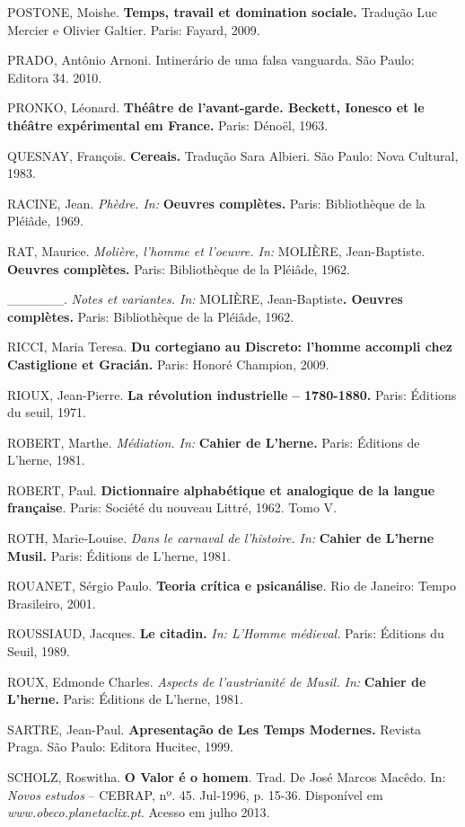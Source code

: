 POSTONE, Moishe. \textbf{Temps, travail et domination sociale.} Tradução
Luc Mercier e Olivier Galtier. Paris: Fayard, 2009.

PRADO, Antônio Arnoni. Intinerário de uma falsa vanguarda. São Paulo:
Editora 34. 2010.

PRONKO, Léonard. \textbf{Théâtre de l'avant-garde. Beckett, Ionesco et
le théâtre expérimental em France.} Paris: Dénoël, 1963.

QUESNAY, François. \textbf{Cereais.} Tradução Sara Albieri. São Paulo:
Nova Cultural, 1983.

RACINE, Jean. \emph{Phèdre. In:} \textbf{Oeuvres complètes.} Paris:
Bibliothèque de la Pléiâde, 1969.

RAT, Maurice. \emph{Molière, l'homme et l'oeuvre. In:} MOLIÈRE,
Jean-Baptiste. \textbf{Oeuvres complètes.} Paris: Bibliothèque de la
Pléiâde, 1962.

\_\_\_\_\_\_. \emph{Notes et variantes. In:} MOLIÈRE,
Jean-Baptiste\textbf{. Oeuvres complètes.} Paris: Bibliothèque de la
Pléiâde, 1962.

RICCI, Maria Teresa. \textbf{Du cortegiano au Discreto: l'homme accompli
chez Castiglione et Gracián.} Paris: Honoré Champion, 2009.

RIOUX, Jean-Pierre. \textbf{La révolution industrielle -- 1780-1880.}
Paris: Éditions du seuil, 1971.

ROBERT, Marthe. \emph{Médiation. In:} \textbf{Cahier de L'herne.} Paris:
Éditions de L'herne, 1981.

ROBERT, Paul. \textbf{Dictionnaire alphabétique et analogique de la
langue française}. Paris: Société du nouveau Littré, 1962. Tomo V.

ROTH, Marie-Louise. \emph{Dans le carnaval de l'histoire.} \emph{In:}
\textbf{Cahier de L'herne Musil.} Paris: Éditions de L'herne, 1981.

ROUANET, Sérgio Paulo. \textbf{Teoria crítica e psicanálise}. Rio de
Janeiro: Tempo Brasileiro, 2001.

ROUSSIAUD, Jacques. \textbf{Le citadin.} \emph{In: L'Homme médieval.}
Paris: Éditions du Seuil, 1989.

ROUX, Edmonde Charles. \emph{Aspects de l'austrianité de Musil. In:}
\textbf{Cahier de L'herne.} Paris: Éditions de L'herne, 1981.

SARTRE, Jean-Paul. \textbf{Apresentação de Les Temps Modernes.} Revista
Praga. São Paulo: Editora Hucitec, 1999.

SCHOLZ, Roswitha. \textbf{O Valor é o homem}. Trad. De José Marcos
Macêdo. In: \emph{Novos} \emph{estudos} -- CEBRAP, nº. 45. Jul-1996, p.
15-36. Disponível em
\emph{www.obeco.planetaclix.pt}. Acesso em julho 2013.

